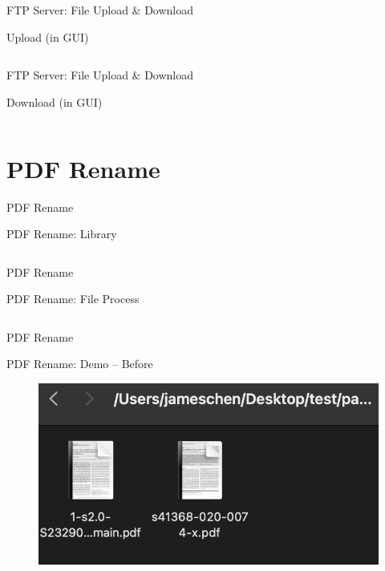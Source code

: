 \documentclass[a4paper,10pt]{beamer}
\begin{document}
\begin{frame}{FTP Server: File Upload \& Download}
	\begin{block}{Upload (in GUI)}
	\inputminted[linenos]{python}{upload.py}
	\end{block}
\end{frame}

\begin{frame}{FTP Server: File Upload \& Download}
\begin{block}{Download (in GUI)}
	\inputminted[linenos]{python}{download.py}
\end{block}  
\end{frame}

\section{PDF Rename}
\begin{frame}{PDF Rename}
\begin{block}{PDF Rename: Library}
	\inputminted[linenos]{python}{PDF1.py}
\end{block}
\end{frame}

\begin{frame}{PDF Rename}
\begin{block}{PDF Rename: File Process}
	\inputminted[linenos]{python}{PDF2.py}
\end{block}
\end{frame}

\begin{frame}{PDF Rename}
\begin{block}{PDF Rename: Demo -- Before}
\begin{figure}[H]
    \includegraphics[width=\textwidth]{file_rename.png}
\end{figure}
\end{block}
\end{frame}
\end{document}
